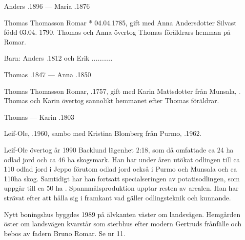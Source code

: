 Anders .1896  ---  Maria .1876


Thomas Thomasson Romar * 04.04.1785, gift med Anna Andersdotter Silvast född 03.04. 1790.
Thomas och Anna övertog Thomas föräldrars hemman på Romar.
\begin{jhchildren}
  \item {}
  \item {}
\end{jhchildren}

Barn:  Anders  .1812 och Erik \textborn ...........

Thomas .1847  ---  Anna .1850


Thomas Thomasson Romar, .1757,  gift med Karin Mattsdotter från Munsala, . Thomas och Karin övertog sannolikt hemmanet efter Thomas föräldrar.
\begin{jhchildren}
  \item {}
\end{jhchildren}

Thomas   ---  Karin .1803






Leif-Ole, .1960, sambo med Kristina Blomberg från Purmo, .1962.

\begin{jhchildren}
  \item {}
  \item {}
\end{jhchildren}
Leif-Ole övertog år 1990 Backlund lägenhet 2:18, som då omfattade ca 24 ha odlad jord och ca 46 ha skogsmark. Han har under åren utökat odlingen till ca 110 odlad jord i Jeppo förutom odlad jord också i Purmo och Munsala och ca 110ha skog. Samtidigt har han fortsatt specialseringen av potatisodlingen, som uppgår till ca 50 ha . Spannmålsproduktion upptar resten av arealen. Han har strävat efter att hålla sig i framkant vad gäller odlingsteknik och kunnande.

Nytt boningshus byggdes 1989 på älvkanten väster om landsvägen. Hemgården öster om landsvägen kvarstår som sterbhus efter modern Gertruds frånfälle och bebos av fadern Bruno Romar. Se nr 11.


